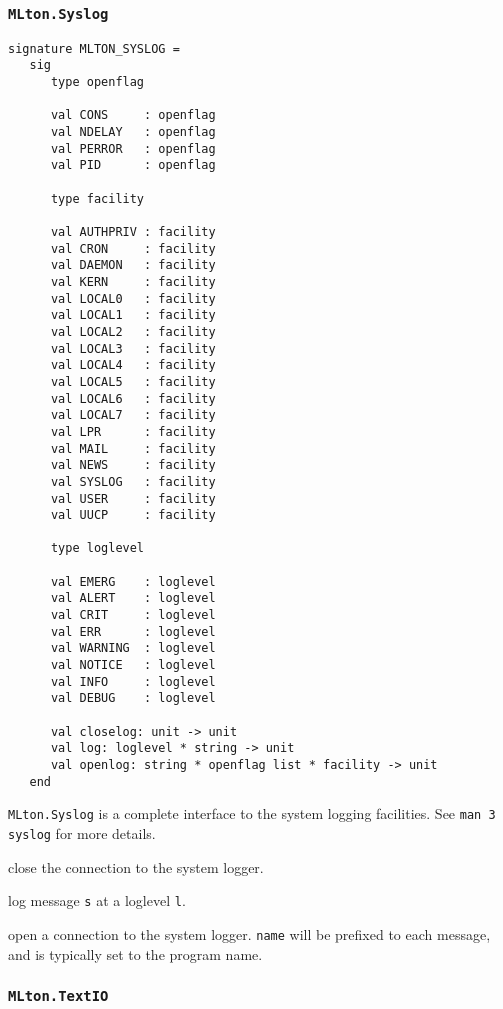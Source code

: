 \subsubsection{\tt MLton.Syslog}

\begin{verbatim}
signature MLTON_SYSLOG =
   sig
      type openflag
         
      val CONS     : openflag
      val NDELAY   : openflag
      val PERROR   : openflag
      val PID      : openflag

      type facility

      val AUTHPRIV : facility
      val CRON     : facility
      val DAEMON   : facility
      val KERN     : facility
      val LOCAL0   : facility
      val LOCAL1   : facility
      val LOCAL2   : facility
      val LOCAL3   : facility
      val LOCAL4   : facility
      val LOCAL5   : facility
      val LOCAL6   : facility
      val LOCAL7   : facility
      val LPR      : facility
      val MAIL     : facility
      val NEWS     : facility
      val SYSLOG   : facility
      val USER     : facility
      val UUCP     : facility

      type loglevel

      val EMERG    : loglevel
      val ALERT    : loglevel
      val CRIT     : loglevel
      val ERR      : loglevel
      val WARNING  : loglevel
      val NOTICE   : loglevel
      val INFO     : loglevel
      val DEBUG    : loglevel

      val closelog: unit -> unit
      val log: loglevel * string -> unit
      val openlog: string * openflag list * facility -> unit
   end
\end{verbatim}

{\tt MLton.Syslog} is a complete interface to the system logging
facilities.  See {\tt man 3 syslog} for more details.

\begin{description}
close the connection to the system logger.

log message {\tt s} at a loglevel {\tt l}.

open a connection to the system logger. {\tt name} will be prefixed to each
message, and is typically set to the program name.

\end{description}
%
\subsubsection{{\tt MLton.TextIO}}

